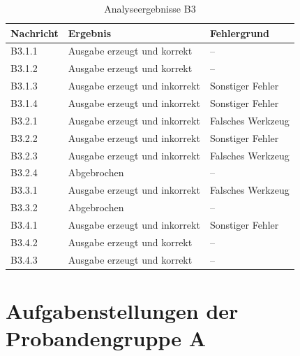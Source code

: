 \begin{table}[h]
    \centering
    \caption{Analyseergebnisse B3}
    \begin{tabular}{C{1.75cm} | C{5cm} | C{5.25cm}}
        \hline
        \textbf{Nachricht} & \textbf{Ergebnis} & \textbf{Fehlergrund} \\
        \hline
        B3.1.1 & Ausgabe erzeugt und korrekt & -- \\
        B3.1.2 & Ausgabe erzeugt und korrekt & -- \\
        B3.1.3 & Ausgabe erzeugt und inkorrekt & Sonstiger Fehler \\
        B3.1.4 & Ausgabe erzeugt und inkorrekt & Sonstiger Fehler \\
        B3.2.1 & Ausgabe erzeugt und inkorrekt & Falsches Werkzeug \\
        B3.2.2 & Ausgabe erzeugt und inkorrekt & Sonstiger Fehler \\
        B3.2.3 & Ausgabe erzeugt und inkorrekt & Falsches Werkzeug \\
        B3.2.4 & Abgebrochen & -- \\
        B3.3.1 & Ausgabe erzeugt und inkorrekt & Falsches Werkzeug \\
        B3.3.2 & Abgebrochen & -- \\
        B3.4.1 & Ausgabe erzeugt und inkorrekt & Sonstiger Fehler \\
        B3.4.2 & Ausgabe erzeugt und korrekt & -- \\
        B3.4.3 & Ausgabe erzeugt und korrekt & -- \\
        \hline
    \end{tabular}
\end{table}

\clearpage

\section*{Aufgabenstellungen der Probandengruppe A}
\label{sec:appendix-aufgabenstellungen}

